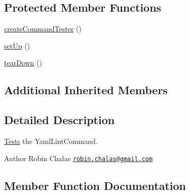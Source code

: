 \subsection*{Protected Member Functions}
\begin{DoxyCompactItemize}
\item 
\mbox{\hyperlink{class_symfony_1_1_component_1_1_yaml_1_1_tests_1_1_command_1_1_lint_command_test_ae6bc94d92eda0f88529807f8e379c1e2}{create\+Command\+Tester}} ()
\item 
\mbox{\hyperlink{class_symfony_1_1_component_1_1_yaml_1_1_tests_1_1_command_1_1_lint_command_test_a0bc688732d2b3b162ffebaf7812e78da}{set\+Up}} ()
\item 
\mbox{\hyperlink{class_symfony_1_1_component_1_1_yaml_1_1_tests_1_1_command_1_1_lint_command_test_a80fe3d17e658907fc75346a0ec9d6fc7}{tear\+Down}} ()
\end{DoxyCompactItemize}
\subsection*{Additional Inherited Members}


\subsection{Detailed Description}
\mbox{\hyperlink{namespace_symfony_1_1_component_1_1_yaml_1_1_tests}{Tests}} the Yaml\+Lint\+Command.

\begin{DoxyAuthor}{Author}
Robin Chalas \href{mailto:robin.chalas@gmail.com}{\tt robin.\+chalas@gmail.\+com} 
\end{DoxyAuthor}


\subsection{Member Function Documentation}
\mbox{\label{class_symfony_1_1_component_1_1_yaml_1_1_tests_1_1_command_1_1_lint_command_test_ae6bc94d92eda0f88529807f8e379c1e2}} 
